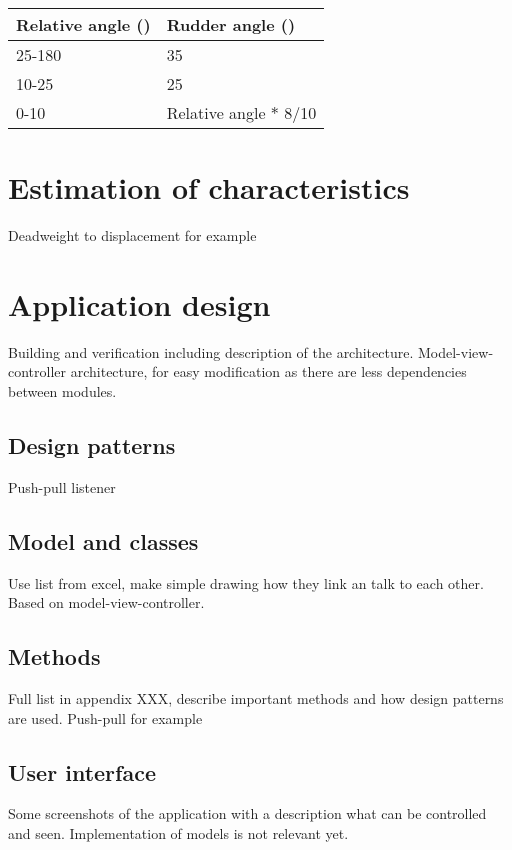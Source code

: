 \begin{table}[H]
	\centering
	\begin{tabular}{l|l}
		\toprule
		Relative angle (\degree) & Rudder angle (\degree) \\
		\midrule
		25-180 & 35\\
		10-25 & 25\\
		0-10 & Relative angle $*$ 8/10 \\
		\bottomrule
	\end{tabular}
	
	\label{tab:Rudder-angle}
\end{table}

\section{Estimation of characteristics}
Deadweight to displacement for example

\section{Application design}
Building and verification including description of the architecture. Model-view-controller architecture, for easy modification as there are less dependencies between modules.

\subsection{Design patterns}
Push-pull listener

\subsection{Model and classes}
Use list from excel, make simple drawing how they link an talk to each other. Based on model-view-controller.

\subsection{Methods}
Full list in appendix XXX, describe important methods and how design patterns are used. Push-pull for example

\subsection{User interface}
Some screenshots of the application with a description what can be controlled and seen. Implementation of models is not relevant yet.
